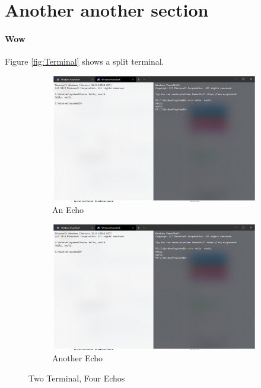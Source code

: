\documentclass{article}
\begin{document}
\section{Another another section}
\paragraph{Wow}
Figure \ref{fig:Terminal} shows a split terminal.


\begin{figure}[!ht]
    \centering
    \begin{subfigure}[b]{0.4\linewidth}
        \includegraphics[width=\linewidth]{echos.jpg}
        \caption{An Echo}
    \end{subfigure}
    \begin{subfigure}[b]{0.4\linewidth}
        \includegraphics[width=\linewidth]{echos.jpg}
        \caption{Another Echo}
    \end{subfigure}
    \caption{Two Terminal, Four Echos}
    \label{fig:TwoTerminal}
\end{figure}
\end{document}
